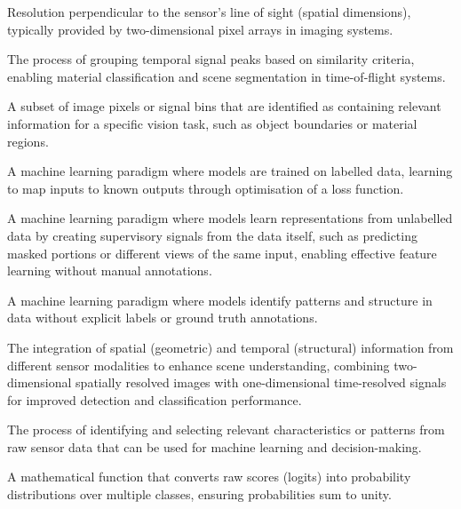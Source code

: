 \documentclass[12pt,a4paper,oneside]{report}
\begin{document}
{\begin{description}[leftmargin=3cm, style=nextline, itemsep=0pt, parsep=0pt, topsep=0pt, partopsep=0pt]
    \item[Lateral resolution] Resolution perpendicular to the sensor's line of sight (spatial dimensions), typically provided by two-dimensional pixel arrays in imaging systems.
    
    \item[Peak clustering] The process of grouping temporal signal peaks based on similarity criteria, enabling material classification and scene segmentation in time-of-flight systems.
    
    \item[Region of interest (ROI)] A subset of image pixels or signal bins that are identified as containing relevant information for a specific vision task, such as object boundaries or material regions.
    
    \item[Supervised learning] A machine learning paradigm where models are trained on labelled data, learning to map inputs to known outputs through optimisation of a loss function.
    
    \item[Self-supervised learning] A machine learning paradigm where models learn representations from unlabelled data by creating supervisory signals from the data itself, such as predicting masked portions or different views of the same input, enabling effective feature learning without manual annotations.
    
    \item[Unsupervised learning] A machine learning paradigm where models identify patterns and structure in data without explicit labels or ground truth annotations.
    
    \item[Spatiotemporal fusion] The integration of spatial (geometric) and temporal (structural) information from different sensor modalities to enhance scene understanding, combining two-dimensional spatially resolved images with one-dimensional time-resolved signals for improved detection and classification performance.
    
    \item[Feature extraction] The process of identifying and selecting relevant characteristics or patterns from raw sensor data that can be used for machine learning and decision-making.
    
    \item[Softmax activation] A mathematical function that converts raw scores (logits) into probability distributions over multiple classes, ensuring probabilities sum to unity.
    

\end{description}}
\end{document}
